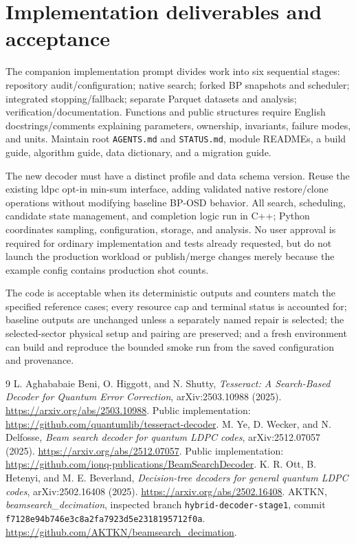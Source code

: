 \documentclass[11pt,a4paper]{article}
\newcommand{\code}[1]{\nolinkurl{#1}}
\begin{document}
\section{Implementation deliverables and acceptance}
The companion implementation prompt divides work into six sequential stages: repository audit/configuration; native search; forked BP snapshots and scheduler; integrated stopping/fallback; separate Parquet datasets and analysis; verification/documentation. Functions and public structures require English docstrings/comments explaining parameters, ownership, invariants, failure modes, and units. Maintain root \code{AGENTS.md} and \code{STATUS.md}, module READMEs, a build guide, algorithm guide, data dictionary, and a migration guide.

The new decoder must have a distinct profile and data schema version. Reuse the existing ldpc opt-in min-sum interface, adding validated native restore/clone operations without modifying baseline BP-OSD behavior. All search, scheduling, candidate state management, and completion logic run in C++; Python coordinates sampling, configuration, storage, and analysis. No user approval is required for ordinary implementation and tests already requested, but do not launch the production workload or publish/merge changes merely because the example config contains production shot counts.

The code is acceptable when its deterministic outputs and counters match the specified reference cases; every resource cap and terminal status is accounted for; baseline outputs are unchanged unless a separately named repair is selected; the selected-sector physical setup and pairing are preserved; and a fresh environment can build and reproduce the bounded smoke run from the saved configuration and provenance.

\begin{thebibliography}{9}
 L. Aghababaie Beni, O. Higgott, and N. Shutty, \emph{Tesseract: A Search-Based Decoder for Quantum Error Correction}, arXiv:2503.10988 (2025). \url{https://arxiv.org/abs/2503.10988}. Public implementation: \url{https://github.com/quantumlib/tesseract-decoder}.
 M. Ye, D. Wecker, and N. Delfosse, \emph{Beam search decoder for quantum LDPC codes}, arXiv:2512.07057 (2025). \url{https://arxiv.org/abs/2512.07057}. Public implementation: \url{https://github.com/ionq-publications/BeamSearchDecoder}.
 K. R. Ott, B. Hetenyi, and M. E. Beverland, \emph{Decision-tree decoders for general quantum LDPC codes}, arXiv:2502.16408 (2025). \url{https://arxiv.org/abs/2502.16408}.
 AKTKN, \emph{beamsearch\_decimation}, inspected branch \code{hybrid-decoder-stage1}, commit \code{f7128e94b746e3c8a2fa7923d5e2318195712f0a}. \url{https://github.com/AKTKN/beamsearch_decimation}.
\end{thebibliography}
\end{document}
